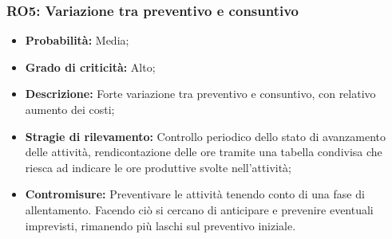 \subsubsection{RO5: Variazione tra preventivo e consuntivo}
\begin{itemize}
    \item \textbf{Probabilità:} Media;
    \item \textbf{Grado di criticità:} Alto;
    \item \textbf{Descrizione:} Forte variazione tra preventivo e consuntivo, con relativo aumento
    dei costi;
    \item \textbf{Stragie di rilevamento:} Controllo periodico dello stato di avanzamento delle
    attività, rendicontazione delle ore tramite una tabella condivisa che riesca ad indicare le ore produttive svolte nell'attività;
    \item \textbf{Contromisure:} Preventivare le attività tenendo conto di una fase di allentamento. Facendo ciò si cercano di anticipare e prevenire eventuali imprevisti, rimanendo più laschi sul preventivo iniziale. 
\end{itemize}
